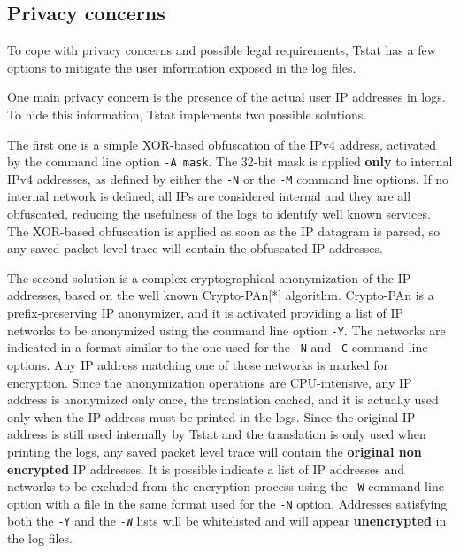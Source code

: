 \documentclass[11pt]{article}
\begin{document}
\subsection{Privacy concerns\label{Privacy_concerns}}


To cope with privacy concerns and possible legal requirements, Tstat has a few options
to mitigate the user information exposed in the log files.



One main privacy concern is the presence of the actual user IP addresses in logs.
To hide this information, Tstat implements two possible solutions.



The first one is a simple XOR-based obfuscation of the IPv4 address, activated by the 
command line option \texttt{-A mask}. The 32-bit mask is applied \textbf{only} to internal IPv4 
addresses, as defined by either the \texttt{-N} or the \texttt{-M} command line options. If no 
internal network is defined, all IPs are considered internal and they are all 
obfuscated, reducing the usefulness of the logs to identify well known services.
The XOR-based obfuscation is applied as soon as the IP datagram is parsed, so
any saved packet level trace will contain the obfuscated IP addresses.



The second solution is a complex cryptographical anonymization of the IP addresses,
based on the well known Crypto-PAn[*] algorithm.
Crypto-PAn is a prefix-preserving IP anonymizer, and it is activated providing a 
list of IP networks to be anonymized using the command line option \texttt{-Y}. 
The networks are indicated in a format similar to the one used for the \texttt{-N} and \texttt{-C}
command line options. Any IP address matching one of those networks is marked for 
encryption. Since the anonymization operations are CPU-intensive, any IP address 
is anonymized only once, the translation cached, and it is actually used only when the 
IP address must be printed in the logs. 
Since the original IP address is still used internally by Tstat and the translation is 
only used when printing the logs, any saved packet level trace will contain the 
\textbf{original non encrypted} IP addresses.
It is possible indicate a list of IP addresses and networks to be excluded from the 
encryption process using the \texttt{-W} command line option with a file in the same format 
used for the \texttt{-N} option. Addresses satisfying both the \texttt{-Y} and the \texttt{-W} lists 
will be whitelisted and will appear \textbf{unencrypted} in the log files.
\end{document}
